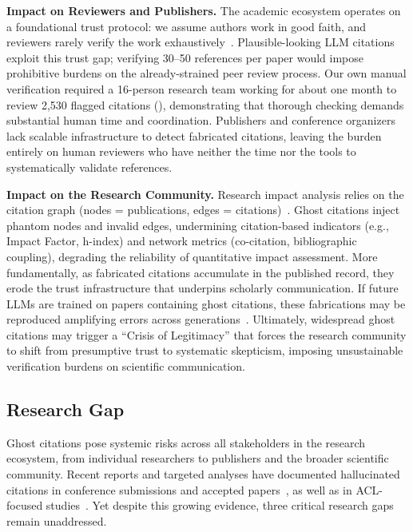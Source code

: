\noindent
\textbf{Impact on Reviewers and Publishers.}
The academic ecosystem operates on a foundational trust protocol: we assume authors work in good faith, and reviewers rarely verify the work exhaustively~\cite{smith2006peer}.
Plausible-looking LLM citations exploit this trust gap; verifying 30--50 references per paper would impose prohibitive burdens on the already-strained peer review process.
Our own manual verification required a 16-person research team working for about one month to review 2,530 flagged citations (), demonstrating that thorough checking demands substantial human time and coordination.
Publishers and conference organizers lack scalable infrastructure to detect fabricated citations, leaving the burden entirely on human reviewers who have neither the time nor the tools to systematically validate references.

\noindent
\textbf{Impact on the Research Community.}
Research impact analysis relies on the citation graph (nodes = publications, edges = citations)~\cite{newman2001structure}.
Ghost citations inject phantom nodes and invalid edges, undermining citation-based indicators (e.g., Impact Factor, h-index) and network metrics (co-citation, bibliographic coupling), degrading the reliability of quantitative impact assessment.
More fundamentally, as fabricated citations accumulate in the published record, they erode the trust infrastructure that underpins scholarly communication.
If future LLMs are trained on papers containing ghost citations, these fabrications may be reproduced amplifying errors across generations~\cite{shumailov2024ai}.
Ultimately, widespread ghost citations may trigger a ``Crisis of Legitimacy'' that forces the research community to shift from presumptive trust to systematic skepticism, imposing unsustainable verification burdens on scientific communication.



\subsection{Research Gap}
\label{sec:research_gap}

Ghost citations pose systemic risks across all stakeholders in the research ecosystem, from individual researchers to publishers and the broader scientific community.
Recent reports and targeted analyses have documented hallucinated citations in conference submissions and accepted papers~\cite{gptzero2026iclr,gptzero2025nips}, as well as in ACL-focused studies~\cite{sakai2026hallucitation}. Yet despite this growing evidence, three critical research gaps remain unaddressed.

